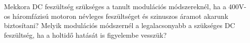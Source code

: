 \begin{example}

Mekkora DC feszültség szükséges a tanult modulációs módszereknél, ha a 400V-os háromfázisú motoron névleges feszültséget és szinuszos áramot akarunk biztosítani? Melyik modulációs módszernél a legalacsonyabb a szükséges DC feszültség, ha a holtidő hatását is figyelembe vesszük?

\tcbline
\vspace{1mm}

\solution

\end{example}